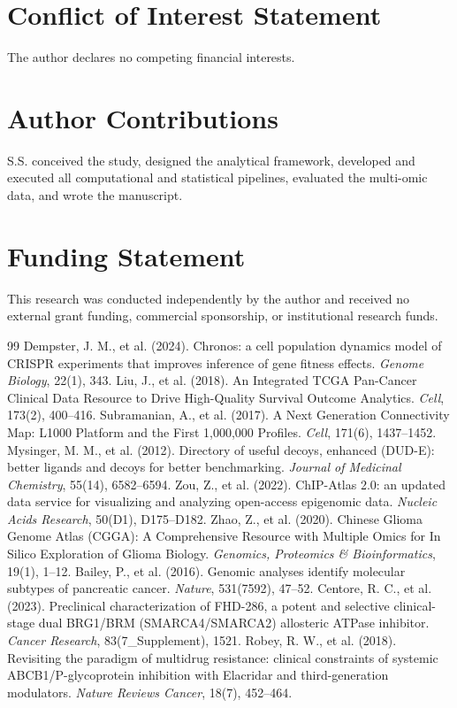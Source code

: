 \documentclass[11pt,a4paper]{article}
\begin{document}
\section*{Conflict of Interest Statement}
The author declares no competing financial interests.

\section*{Author Contributions}
S.S. conceived the study, designed the analytical framework, developed and executed all computational and statistical pipelines, evaluated the multi-omic data, and wrote the manuscript.

\section*{Funding Statement}
This research was conducted independently by the author and received no external grant funding, commercial sponsorship, or institutional research funds.

\begin{thebibliography}{99}
 Dempster, J. M., et al. (2024). Chronos: a cell population dynamics model of CRISPR experiments that improves inference of gene fitness effects. \textit{Genome Biology}, 22(1), 343.
 Liu, J., et al. (2018). An Integrated TCGA Pan-Cancer Clinical Data Resource to Drive High-Quality Survival Outcome Analytics. \textit{Cell}, 173(2), 400--416.
 Subramanian, A., et al. (2017). A Next Generation Connectivity Map: L1000 Platform and the First 1,000,000 Profiles. \textit{Cell}, 171(6), 1437--1452.
 Mysinger, M. M., et al. (2012). Directory of useful decoys, enhanced (DUD-E): better ligands and decoys for better benchmarking. \textit{Journal of Medicinal Chemistry}, 55(14), 6582--6594.
 Zou, Z., et al. (2022). ChIP-Atlas 2.0: an updated data service for visualizing and analyzing open-access epigenomic data. \textit{Nucleic Acids Research}, 50(D1), D175--D182.
 Zhao, Z., et al. (2020). Chinese Glioma Genome Atlas (CGGA): A Comprehensive Resource with Multiple Omics for In Silico Exploration of Glioma Biology. \textit{Genomics, Proteomics \& Bioinformatics}, 19(1), 1--12.
 Bailey, P., et al. (2016). Genomic analyses identify molecular subtypes of pancreatic cancer. \textit{Nature}, 531(7592), 47--52.
 Centore, R. C., et al. (2023). Preclinical characterization of FHD-286, a potent and selective clinical-stage dual BRG1/BRM (SMARCA4/SMARCA2) allosteric ATPase inhibitor. \textit{Cancer Research}, 83(7\_Supplement), 1521.
 Robey, R. W., et al. (2018). Revisiting the paradigm of multidrug resistance: clinical constraints of systemic ABCB1/P-glycoprotein inhibition with Elacridar and third-generation modulators. \textit{Nature Reviews Cancer}, 18(7), 452--464.
\end{thebibliography}
\end{document}
